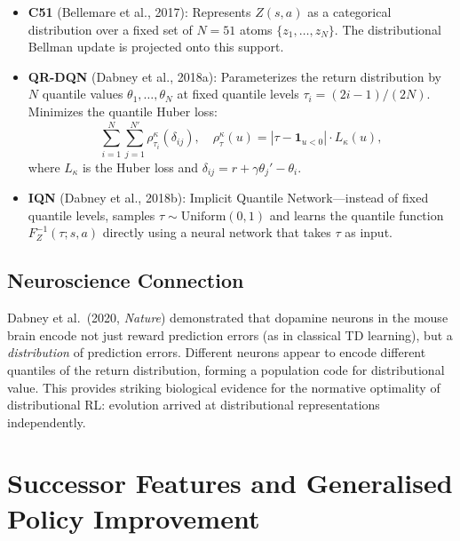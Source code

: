 \documentclass[11pt,a4paper]{article}
\begin{document}
\begin{itemize}[leftmargin=*]
  \item \textbf{C51} (Bellemare et al., 2017): Represents $Z(s,a)$ as a categorical
    distribution over a fixed set of $N = 51$ atoms $\{z_1, \ldots, z_N\}$.
    The distributional Bellman update is projected onto this support.

  \item \textbf{QR-DQN} (Dabney et al., 2018a): Parameterizes the return distribution
    by $N$ quantile values $\theta_1, \ldots, \theta_N$ at fixed quantile levels
    $\tau_i = (2i-1)/(2N)$. Minimizes the quantile Huber loss:
    \[
      \sum_{i=1}^N \sum_{j=1}^{N'} \rho_{\tau_i}^\kappa(\delta_{ij}),
      \quad \rho_\tau^\kappa(u) = |\tau - \mathbf{1}_{u < 0}| \cdot L_\kappa(u),
    \]
    where $L_\kappa$ is the Huber loss and $\delta_{ij} = r + \gamma \theta_j' - \theta_i$.

  \item \textbf{IQN} (Dabney et al., 2018b): Implicit Quantile Network---instead of
    fixed quantile levels, samples $\tau \sim \text{Uniform}(0,1)$ and learns the
    quantile function $F_Z^{-1}(\tau; s, a)$ directly using a neural network that
    takes $\tau$ as input.
\end{itemize}

\subsection{Neuroscience Connection}

\begin{tcolorbox}[colback=green!5!white, colframe=green!60!black, title=Distributional Coding in the Brain]
Dabney et al.\ (2020, \emph{Nature}) demonstrated that dopamine neurons in the
mouse brain encode not just reward prediction errors (as in classical TD
learning), but a \emph{distribution} of prediction errors. Different neurons
appear to encode different quantiles of the return distribution, forming a
population code for distributional value. This provides striking biological
evidence for the normative optimality of distributional RL: evolution arrived
at distributional representations independently.
\end{tcolorbox}


\section{Successor Features and Generalised Policy Improvement}
\label{sec:sf}
\end{document}
